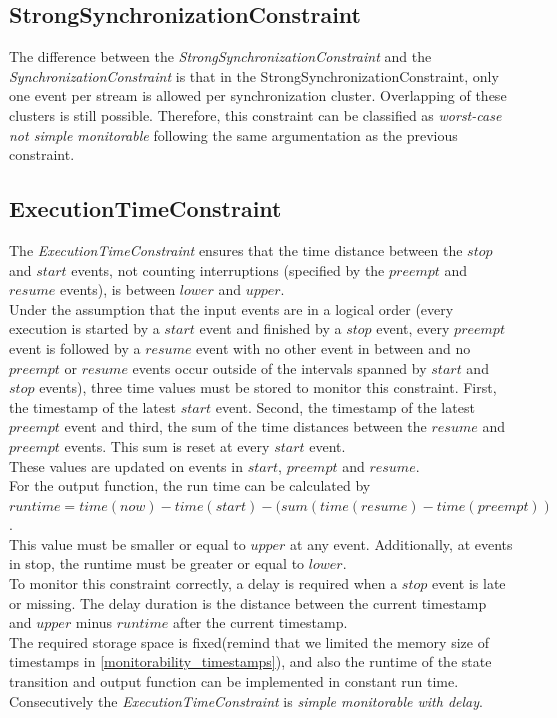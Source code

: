 	
\subsection{StrongSynchronizationConstraint}
	The difference between the \emph{StrongSynchronizationConstraint} and the \emph{SynchronizationConstraint} is that in the StrongSynchronizationConstraint, only one event per stream is allowed per synchronization cluster. Overlapping of these clusters is still possible. Therefore, this constraint can be classified as \textit{worst-case not simple monitorable} following the same argumentation as the previous constraint.
	
	
\subsection{ExecutionTimeConstraint}
	The \emph{ExecutionTimeConstraint} ensures that the time distance between the $stop$ and $start$ events, not counting interruptions (specified by the $preempt$ and $resume$ events), is between $lower$ and $upper$.\\
	Under the assumption that the input events are in a logical order (every execution is started by a $start$ event and finished by a $stop$ event, every $preempt$ event is followed by a $resume$ event with no other event in between and no $preempt$ or $resume$ events occur outside of the intervals spanned by $start$ and $stop$ events), three time values must be stored to monitor this constraint. First, the timestamp of the latest $start$ event. Second, the timestamp of the latest $preempt$ event and third, the sum of the time distances between the $resume$ and $preempt$ events. This sum is reset at every $start$ event.\\
	These values are updated on events in $start$, $preempt$ and $resume$.\\
	For the output function, the run time can be calculated by\\ $runtime = time(now) - time(start) - (sum(time(resume) - time(preempt))$.\\ 
	This value must be smaller or equal to $upper$ at any event. Additionally, at events in stop, the runtime must be greater or equal to $lower$.\\
	To monitor this constraint correctly, a delay is required when a $stop$ event is late or missing. The delay duration is the distance between the current timestamp and $upper$ minus $runtime$ after the current timestamp.\\
	The required storage space is fixed(remind that we limited the memory size of timestamps in \ref{monitorability_timestamps}), and also the runtime of the state transition and output function can be implemented in constant run time. Consecutively the \emph{ExecutionTimeConstraint} is \textit{simple monitorable with delay}.



